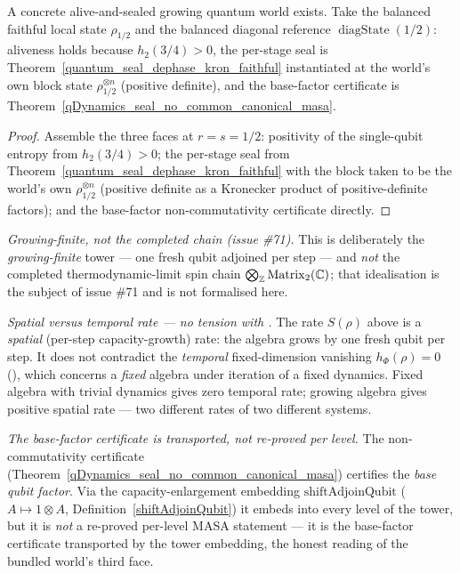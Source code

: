\begin{theorem}\label{growingQuantumWorld_exists}
  \leanok
  A concrete alive-and-sealed growing quantum world exists. Take the balanced faithful local state
  \(\rho_{1/2}\) and the balanced diagonal reference \(\operatorname{diagState}(1/2)\): aliveness holds
  because \(h_2(3/4) > 0\), the per-stage seal is
  Theorem~\ref{quantum_seal_dephase_kron_faithful} instantiated at the world's own block state
  \(\rho_{1/2}^{\otimes n}\) (positive definite), and the base-factor certificate is
  Theorem~\ref{qDynamics_seal_no_common_canonical_masa}.
\end{theorem}
\begin{proof}\leanok
  Assemble the three faces at \(r = s = 1/2\): positivity of the single-qubit entropy from
  \(h_2(3/4) > 0\); the per-stage seal from Theorem~\ref{quantum_seal_dephase_kron_faithful} with the
  block taken to be the world's own \(\rho_{1/2}^{\otimes n}\) (positive definite as a Kronecker
  product of positive-definite factors); and the base-factor non-commutativity certificate directly.
\end{proof}

\emph{Growing-finite, not the completed chain (issue \#71).} This is deliberately the
\emph{growing-finite} tower --- one fresh qubit adjoined per step --- and \emph{not} the completed
thermodynamic-limit spin chain \(\bigotimes_{\mathbb{Z}}\operatorname{Matrix}_2(\mathbb{C})\); that idealisation is the
subject of issue \#71 and is not formalised here.

\emph{Spatial versus temporal rate --- no tension with .} The rate
\(S(\rho)\) above is a \emph{spatial} (per-step capacity-growth) rate: the algebra grows by one fresh
qubit per step. It does not contradict the \emph{temporal} fixed-dimension vanishing
\(h_\Phi(\rho) = 0\) (), which concerns a \emph{fixed} algebra under
iteration of a fixed dynamics. Fixed algebra with trivial dynamics gives zero temporal rate; growing
algebra gives positive spatial rate --- two different rates of two different systems.

\emph{The base-factor certificate is transported, not re-proved per level.} The non-commutativity
certificate (Theorem~\ref{qDynamics_seal_no_common_canonical_masa}) certifies the \emph{base qubit
factor}. Via the capacity-enlargement embedding \(\mathrm{shiftAdjoinQubit}\) (\(A\mapsto 1\otimes A\),
Definition~\ref{shiftAdjoinQubit}) it embeds into every level of the tower, but it is \emph{not} a
re-proved per-level MASA statement --- it is the base-factor certificate transported by the tower
embedding, the honest reading of the bundled world's third face.

